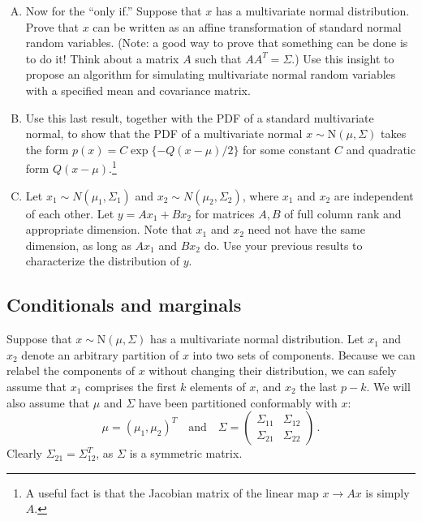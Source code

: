 \documentclass[11pt]{article}
\newcommand{\N}{\mbox{N}}
\begin{document}
\begin{enumerate}[(A)]
\item Now for the ``only if.''  Suppose that $x$ has a multivariate normal distribution.  Prove that $x$ can be written as an affine transformation of standard normal random variables.  (Note: a good way to prove that something can be done is to do it!  Think about a matrix $A$ such that $A A^T = \Sigma$.)  Use this insight to propose an algorithm for simulating multivariate normal random variables with a specified mean and covariance matrix.

\item Use this last result, together with the PDF of a standard multivariate normal, to show that the PDF of a multivariate normal $x \sim \N(\mu, \Sigma)$ takes the form $p(x) = C \exp\{-Q(x-\mu)/2\}$ for some constant $C$ and quadratic form $Q(x-\mu)$.\footnote{A useful fact is that the Jacobian matrix of the linear map $x \rightarrow Ax$ is simply $A$.}


\item Let $x_1 \sim N(\mu_1, \Sigma_1)$ and $x_2 \sim N(\mu_2, \Sigma_2)$, where $x_1$ and $x_2$ are independent of each other.  Let $y = A x_1 + B x_2$ for matrices $A,B$ of full column rank and appropriate dimension.  Note that $x_1$ and $x_2$ need not have the same dimension, as long as $A x_1$ and $B x_2$ do.  Use your previous results to characterize the distribution of $y$.

\end{enumerate}

\subsection{Conditionals and marginals}

Suppose that $x \sim \N(\mu, \Sigma)$ has a multivariate normal distribution.  Let $x_1$ and $x_2$ denote an arbitrary partition of $x$ into two sets of components.  Because we can relabel the components of $x$ without changing their distribution, we can safely assume that $x_1$ comprises the first $k$ elements of $x$, and $x_2$ the last $p-k$.  We will also assume that $\mu$ and $\Sigma$ have been partitioned conformably with $x$:
$$
\mu = (\mu_1, \mu_2)^T \quad \mbox{and} \quad \Sigma =
\left(
\begin{array}{cc}
\Sigma_{11} & \Sigma_{12} \\
\Sigma_{21} & \Sigma_{22} 
\end{array}
\right) \, .
$$
Clearly $\Sigma_{21} = \Sigma_{12}^T$, as $\Sigma$ is a symmetric matrix.
\end{document}
